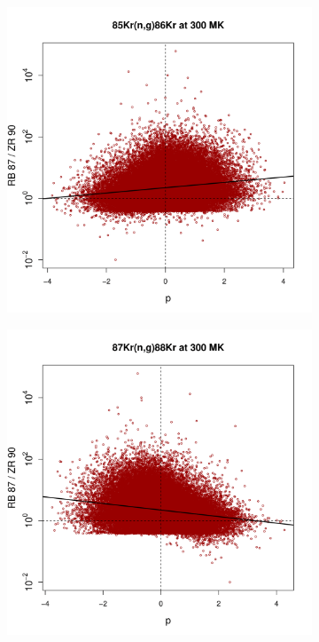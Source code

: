 \begin{figure}[t]
\begin{subfigure}[b]{0.495\textwidth}
\end{subfigure}
\begin{subfigure}[b]{0.495\textwidth}   
\centering 
\includegraphics[width=\textwidth]{Chapter-3/figs/CorrRB87ZR90_85Kr_n_g_86Kr_300MK.png}
\end{subfigure}
\hfill
\begin{subfigure}[b]{0.495\textwidth}   
\centering 
\includegraphics[width=\textwidth]{Chapter-3/figs/CorrRB87ZR90_87Kr_n_g_88Kr_300MK.png}

\end{subfigure}
\end{figure}
